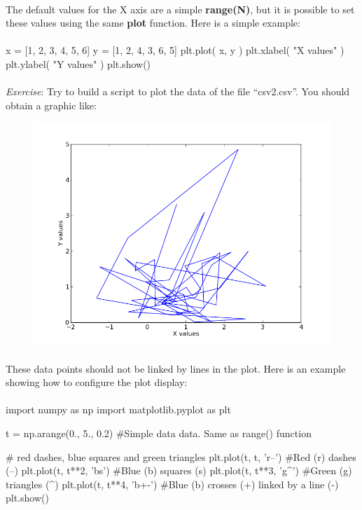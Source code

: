 \documentclass[article,10pt]{scrartcl}
\begin{document}
\paragraph{}
The default values for the X axis are a simple \textbf{range(N)}, but it is possible to set these values using the same \textbf{plot} function. Here is a simple example:
\paragraph{}
\begin{python}
x = [1, 2, 3, 4, 5, 6]
y = [1, 2, 4, 3, 6, 5]  
plt.plot( x, y )
plt.xlabel( "X values" )
plt.ylabel( "Y values" )
plt.show()
\end{python}
\paragraph{}
\emph{Exercise}: Try to build a script to plot the data of the file ``csv2.csv''.
You should obtain a graphic like:
\begin{figure}[h!]
\begin{center}
\includegraphics[scale=0.5]{figure_1.png}\\
\end{center}
\end{figure}
\paragraph{}
These data points should not be linked by lines in the plot. Here is an example showing how to configure the plot display:
\paragraph{}
\begin{python}
import numpy as np
import matplotlib.pyplot as plt

t = np.arange(0., 5., 0.2) #Simple data data. Same as range() function

# red dashes, blue squares and green triangles
plt.plot(t, t, 'r--')    #Red (r) dashes (--)
plt.plot(t, t**2, 'bs')  #Blue (b) squares (s)
plt.plot(t, t**3, 'g^')  #Green (g) triangles (^)
plt.plot(t, t**4, 'b+-') #Blue (b) crosses (+) linked by a line (-)
plt.show()
\end{python}
\end{document}

